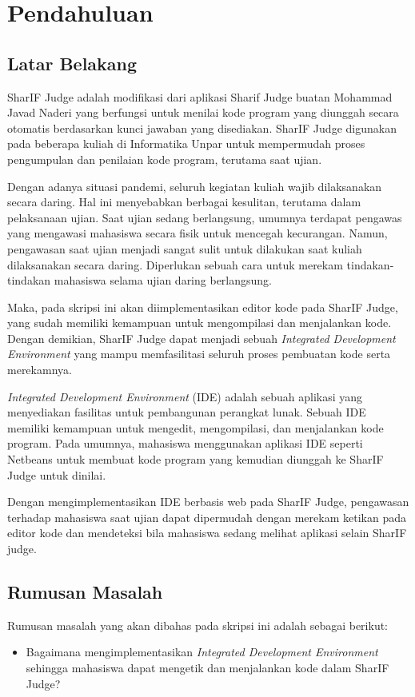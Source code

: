 \chapter{Pendahuluan}
\label{chap:intro}
   
\section{Latar Belakang}
\label{sec:label}

SharIF Judge adalah modifikasi dari aplikasi Sharif Judge buatan Mohammad Javad Naderi yang berfungsi untuk menilai kode program yang diunggah secara otomatis berdasarkan kunci jawaban yang disediakan. SharIF Judge digunakan pada beberapa kuliah di Informatika Unpar untuk mempermudah proses pengumpulan dan penilaian kode program, terutama saat ujian.

Dengan adanya situasi pandemi, seluruh kegiatan kuliah wajib dilaksanakan secara daring. Hal ini menyebabkan berbagai kesulitan, terutama dalam pelaksanaan ujian. Saat ujian sedang berlangsung, umumnya terdapat pengawas yang mengawasi mahasiswa secara fisik untuk mencegah kecurangan. Namun, pengawasan saat ujian menjadi sangat sulit untuk dilakukan saat kuliah dilaksanakan secara daring. Diperlukan sebuah cara untuk merekam tindakan-tindakan mahasiswa selama ujian daring berlangsung. 

Maka, pada skripsi ini akan diimplementasikan editor kode pada SharIF Judge, yang sudah memiliki kemampuan untuk mengompilasi dan menjalankan kode. Dengan demikian, SharIF Judge dapat menjadi sebuah {\it Integrated Development Environment} yang mampu memfasilitasi seluruh proses pembuatan kode serta merekamnya.

{\it Integrated Development Environment} (IDE) adalah sebuah aplikasi yang menyediakan fasilitas untuk pembangunan perangkat lunak. Sebuah IDE memiliki kemampuan untuk mengedit, mengompilasi, dan menjalankan kode program. Pada umumnya, mahasiswa menggunakan aplikasi IDE seperti Netbeans untuk membuat kode program yang kemudian diunggah ke SharIF Judge untuk dinilai.

Dengan mengimplementasikan IDE berbasis web pada SharIF Judge, pengawasan terhadap mahasiswa saat ujian dapat dipermudah dengan merekam ketikan pada editor kode dan mendeteksi bila mahasiswa sedang melihat aplikasi selain SharIF judge.


\section{Rumusan Masalah}
\label{sec:rumusan}
Rumusan masalah yang akan dibahas pada skripsi ini adalah sebagai berikut:
\begin{itemize}
	\item Bagaimana mengimplementasikan {\it Integrated Development Environment} sehingga mahasiswa dapat mengetik dan menjalankan kode dalam SharIF Judge?
\end{itemize}


